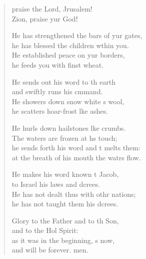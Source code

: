 \settowidth{\versewidth}{He has strengthened the bars of your gates, *}
\begin{verse}%
  \begin{patverse}
     praise the Lord, Jrusalem!\Med\\
    Zion, praise yur God!
    
    He has strengthened the bars of yur gates,\Med\\
    he has blessed the children w\pointup{\i}thin you.\\
    He established peace on yur borders,\Med\\
    he feeds you with finst wheat.
    
    He sends out his word to th earth\Med\\
    and swiftly runs his cmmand.\\
    He showers down snow white s wool,\Med\\
    he scatters hoar-frost l\pointup{\i}ke ashes.
    
    He hurls down hailstones l\pointup{\i}ke crumbs.\Med\\
    The waters are frozen at h\pointup{\i}s touch;\\
    he sends forth his word and \pointup{\i}t melts them:\Med\\
    at the breath of his mouth the watrs flow.
    
    He makes his word known t Jacob,\Med\\
    to Israel his laws and dcrees.\\
    He has not dealt thus with othr nations;\Med\\
    he has not taught them his dcrees.
    
    Glory to the Father and to th Son,\Med\\
    and to the Hol Spirit:\\
    as it was in the beginning, \pointup{\i}s now,\Med\\
    and will be forever. men.
  \end{patverse}
\end{verse}
